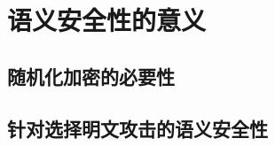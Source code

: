 \section{语义安全性的意义}\label{sec:11-3}

\subsection{随机化加密的必要性}\label{subsec:11-3-1}

\subsection{针对选择明文攻击的语义安全性}\label{subsec:11-3-2}

\begin{game}\label{game:11-2}
	
\end{game}

\begin{definition}\label{def:11-4}
	
\end{definition}

\begin{theorem}\label{theo:11-1}
	
\end{theorem}